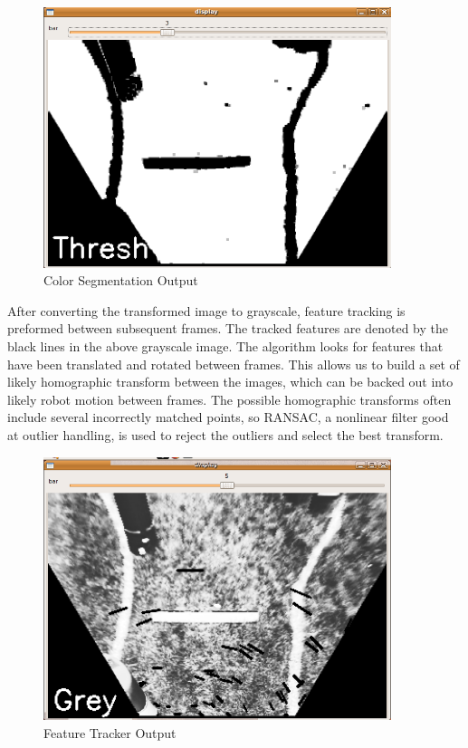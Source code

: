 \begin{figure}[H]
\begin{center}
\includegraphics[width=4in]{./pics/thresh.png}
\caption{Color Segmentation Output}
\label{FIG:ColorSeg}
\end{center}
\end{figure}

After converting the transformed image to grayscale, feature tracking is preformed between subsequent frames. The tracked features are denoted by the black lines in the above grayscale image. The algorithm looks for features that have been translated and rotated between frames. This allows us to build a set of likely homographic transform between the images, which can be backed out into likely robot motion between frames. The possible homographic transforms often include several incorrectly matched points, so RANSAC, a nonlinear filter good at outlier handling, is used to reject the outliers and select the best transform.

\begin{figure}[H]
\begin{center}
\includegraphics[width=4in]{./pics/feature.png}
\caption{Feature Tracker Output}
\label{FIG:ColorSeg}
\end{center}
\end{figure}

